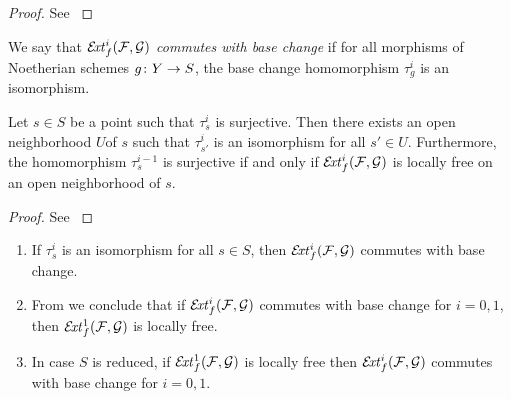 \begin{proof}
	See \cite[Prop. 1.3]{lange-universal-extensions}
\end{proof}

\begin{definition}
	We say that $\mathcal{E}\!\mathit{xt}^i_{f}(\mathcal{F},\mathcal{G})$ \emph{commutes with base change} if for all morphisms of Noetherian schemes $g \colon Y \to S$, the base change homomorphism $\tau^i_g$ is an isomorphism.
\end{definition}

\begin{proposition}
\label{prop:ext-base-change}
	Let $s \in S$ be a point such that $\tau^i_s$ is surjective. Then there exists an open neighborhood $U$of $s$ such that $\tau^i_{s'}$ is an isomorphism for all $s'\in U$.
	Furthermore, the homomorphism $\tau^{i-1}_{s}$ is surjective if and only if $\mathcal{E}\!\mathit{xt}^i_{f}(\mathcal{F},\mathcal{G})$ is locally free on an open neighborhood of $s$.
\end{proposition}

\begin{proof}
	See \cite[Thm. 1.4]{lange-universal-extensions}
\end{proof}

\begin{remark}
\begin{enumerate}
	\item If $\tau^i_{s}$ is an isomorphism for all $s\in S$, then $\mathcal{E}\!\mathit{xt}_{f}^i(\mathcal{F},\mathcal{G})$ commutes with base change.

	\item From  we conclude that if $\mathcal{E}\!\mathit{xt}^i_f(\mathcal{F},\mathcal{G})$ commutes with base change for $i=0,1$, then $\mathcal{E}\!\mathit{xt}^1_f(\mathcal{F},\mathcal{G})$ is locally free.

	\item In case $S$ is reduced, if $\mathcal{E}\!\mathit{xt}^1_f(\mathcal{F},\mathcal{G})$ is locally free then $\mathcal{E}\!\mathit{xt}^i_f(\mathcal{F},\mathcal{G})$ commutes with base change for $i=0,1$.
\end{enumerate}
\end{remark}

